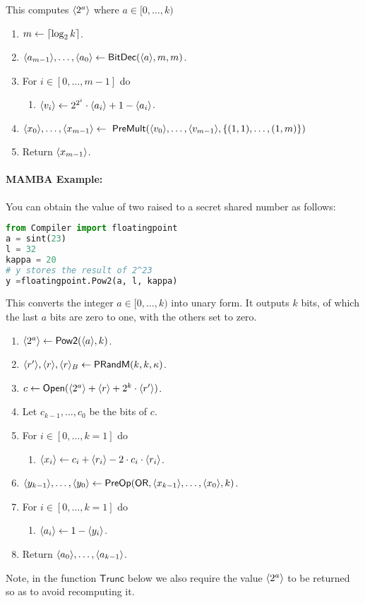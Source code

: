 This computes $\langle 2^a \rangle$ where $a \in [0,\ldots,k)$
\begin{enumerate}
\item $m \leftarrow {\lceil \log_2 k \rceil}$.
\item $\langle a_{m-1} \rangle,\ldots,\langle a_0 \rangle \leftarrow \mathsf{BitDec}(\langle a \rangle,m,m)$.
\item For $i\in [0,\ldots,m-1]$ do 
\begin{enumerate}
  \item $\langle v_i \rangle \leftarrow 2^{2^i} \cdot \langle a_i \rangle+1-\langle a_i \rangle$.
\end{enumerate}
\item $\langle x_0 \rangle,\ldots,\langle x_{m-1} \rangle
	\leftarrow \ \mathsf{PreMult}(\langle v_0 \rangle,\ldots,\langle v_{m-1} \rangle, \{(1,1),\ldots,(1,m)\})$
\item Return $\langle x_{m-1} \rangle$.
\end{enumerate}
\paragraph{MAMBA Example:} You can obtain the value of two raised to a secret shared number as follows: 
\begin{lstlisting}[language={python}]
from Compiler import floatingpoint
a = sint(23)
l = 32
kappa = 20
# y stores the result of 2^23
y =floatingpoint.Pow2(a, l, kappa)
\end{lstlisting}


This converts the integer $a \in [0,\ldots,k)$ into unary form.
It outputs $k$ bits, of which the last $a$ bits are zero to one,
with the others set to zero.
\begin{enumerate}
\item $\langle 2^a \rangle \leftarrow \mathsf{Pow2}(\langle a \rangle,k)$.
\item $\langle r' \rangle, \langle r \rangle, \langle r \rangle_B \leftarrow \mathsf{PRandM}(k,k,\kappa)$.
\item $c \leftarrow {\mathsf{Open}}(\langle 2^a \rangle+\langle r \rangle+2^k \cdot \langle r' \rangle)$.
\item Let $c_{k-1},\ldots,c_0$ be the bits of $c$.
\item For $i \in [0,\ldots,k=1]$ do
\begin{enumerate}
	\item $\langle x_i \rangle \leftarrow c_i+\langle r_i \rangle-2 \cdot c_i \cdot \langle r_i \rangle$.
\end{enumerate}
\item $\langle y_{k-1} \rangle,\ldots,\langle y_0 \rangle \leftarrow \mathsf{PreOp}(\mathsf{OR},\langle x_{k-1} \rangle,\ldots,\langle x_0 \rangle,k)$.
\item For $i \in [0,\ldots,k=1]$ do
\begin{enumerate}
	\item $\langle a_i \rangle \leftarrow 1-\langle y_i \rangle$.
\end{enumerate}
\item Return $\langle a_0 \rangle,\ldots,\langle a_{k-1} \rangle$.
\end{enumerate}
Note, in the function $\mathsf{Trunc}$ below we also require the
value $\langle 2^a \rangle$ to be returned so as to avoid recomputing it.

